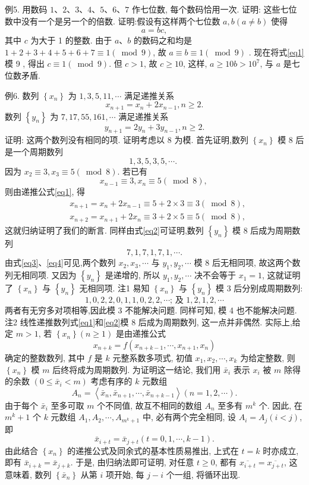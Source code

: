 例5. 用数码 $1 、 2 、 3 、 4 、 5 、 6 、 7$ 作七位数, 每个数码恰用一次.
证明: 这些七位数中没有一个是另一个的倍数.
证明:假设有这样两个七位数 $a, b(a \neq b)$ 使得
$$
a=b c, \label{eq1}
$$
其中 $c$ 为大于 1 的整数.
由于 $a 、 b$ 的数码之和均是 $1+2+3+4+5+6+ 7 \equiv 1(\bmod 9)$, 故 $a \equiv b \equiv 1(\bmod 9)$ . 现在将式\ref{eq1}模 9 , 得出 $c \equiv 1(\bmod 9)$. 但 $c>1$, 故 $c \geqslant 10$, 这样, $a \geqslant 10 b>10^7$, 与 $a$ 是七位数矛盾.



例6. 数列 $\left\{x_n\right\}$ 为 $1,3,5,11, \cdots$ 满足递推关系
$$
x_{n+1}=x_n+2 x_{n-1}, n \geqslant 2 . \label{eq1}
$$
数列 $\left\{y_n\right\}$ 为 $7,17,55,161, \cdots$ 满足递推关系
$$
y_{n+1}=2 y_n+3 y_{n-1}, n \geqslant 2 . \label{eq2}
$$
证明: 这两个数列没有相同的项.
证明考虑以 8 为模.
首先证明,数列 $\left\{x_n\right\}$ 模 8 后是一个周期数列
$$
1,3,5,3,5, \cdots \text {. } \label{eq3}
$$
因为 $x_2 \equiv 3, x_3 \equiv 5(\bmod 8)$. 若已有
$$
x_{n-1} \equiv 3, x_n \equiv 5(\bmod 8) \text {, }
$$
则由递推公式\ref{eq1}, 得
$$
\begin{aligned}
& x_{n+1}=x_n+2 x_{n-1} \equiv 5+2 \times 3 \equiv 3(\bmod 8), \\
& x_{n+2}=x_{n+1}+2 x_n \equiv 3+2 \times 5 \equiv 5(\bmod 8),
\end{aligned}
$$
这就归纳证明了我们的断言.
同样由式\ref{eq2}可证明,数列 $\left\{y_n\right\}$ 模 8 后成为周期数列
$$
7,1,7,1,7,1, \cdots . \label{eq4}
$$
由式\ref{eq3}、\ref{eq4}可见,两个数列 $x_2, x_3, \cdots$ 与 $y_1, y_2, \cdots$ 模 8 后无相同项, 故这两个数列无相同项.
又因为 $\left\{y_n\right\}$ 是递增的, 所以 $y_1, y_2, \cdots$ 决不会等于 $x_1=1$, 这就证明了 $\left\{x_n\right\}$ 与 $\left\{y_n\right\}$ 无相同项.
注1 易知 $\left\{x_n\right\}$ 与 $\left\{y_n\right\}$ 模 3 后分别成周期数列:
$$
1,0,2,2,0,1,1,0,2,2, \cdots \text {; 及 } 1,2,1,2, \cdots
$$
两者有无穷多对项相等,因此模 3 不能解决问题.
同样可知, 模 4 也不能解决问题.
注2 线性递推数列式\ref{eq1}和\ref{eq2}模 8 后成为周期数列, 这一点并非偶然.
实际上,给定 $m>1$, 若 $\left\{x_n\right\}(n \geqslant 1)$ 是由递推公式
$$
x_{n+k}=f\left(x_{n+k-1}, \cdots, x_{n+1}, x_n\right)
$$
确定的整数数列, 其中 $f$ 是 $k$ 元整系数多项式, 初值 $x_1, x_2, \cdots, x_k$ 为给定整数, 则 $\left\{x_n\right\}$ 模 $m$ 后终将成为周期数列.
为证明这一结论, 我们用 $\bar{x}_i$ 表示 $x_i$ 被 $m$ 除得的余数 $\left(0 \leqslant \bar{x}_i<m\right)$ 考虑有序的 $k$ 元数组
$$
A_n=\left\langle\bar{x}_n, \bar{x}_{n+1}, \cdots, \bar{x}_{n+k-1}\right\rangle(n=1,2, \cdots) .
$$
由于每个 $\bar{x}_i$ 至多可取 $m$ 个不同值, 故互不相同的数组 $A_n$ 至多有 $m^k$ 个.
因此, 在 $m^k+1$ 个 $k$ 元数组 $A_1, A_2, \cdots, A_{m^k+1}$ 中, 必有两个完全相同, 设 $A_i= A_j(i<j)$, 即
$$
\bar{x}_{i+t}=\bar{x}_{j+t}(t=0,1, \cdots, k-1) .
$$
由此结合 $\left\{x_n\right\}$ 的递推公式及同余式的基本性质易推出, 上式在 $t=k$ 时亦成立, 即有 $\bar{x}_{i+k}=\bar{x}_{j+k}$. 于是, 由归纳法即可证明, 对任意 $t \geqslant 0$, 都有 $\overline{x_{i+t}}=\overline{x_{j+t}}$, 这意味着, 数列 $\left\{\bar{x}_n\right\}$ 从第 $i$ 项开始, 每 $j-i$ 个一组, 将循环出现.



